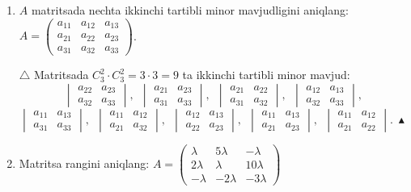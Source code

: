 \begin{enumerate}
\item $A$ matritsada nechta ikkinchi tartibli minor mavjudligini aniqlang:
$A=\begin{pmatrix}
	a_{11}&a_{12}&a_{13}\\
	a_{21}&a_{22}&a_{23}\\
	a_{31}&a_{32}&a_{33}
\end{pmatrix}$.

$\triangle$ Matritsada $C_3^2\cdot C_3^2=3\cdot3=9$ ta ikkinchi tartibli minor mavjud:
$$\begin{vmatrix}
	a_{22}&a_{23}\\
	a_{32}&a_{33}
\end{vmatrix},\ \ \begin{vmatrix}
a_{21}&a_{23}\\
a_{31}&a_{33}
\end{vmatrix},\ \ \begin{vmatrix}
a_{21}&a_{22}\\
a_{31}&a_{32}
\end{vmatrix},\ \ \begin{vmatrix}
a_{12}&a_{13}\\
a_{32}&a_{33}
\end{vmatrix},$$
$$\begin{vmatrix}
	a_{11}&a_{13}\\
	a_{31}&a_{33}
\end{vmatrix},\ \ \begin{vmatrix}
a_{11}&a_{12}\\
a_{21}&a_{32}
\end{vmatrix},\ \ \begin{vmatrix}
a_{12}&a_{13}\\
a_{22}&a_{23}
\end{vmatrix},\ \ \begin{vmatrix}
a_{11}&a_{13}\\
a_{21}&a_{23}
\end{vmatrix},\ \ \begin{vmatrix}
a_{11}&a_{12}\\
a_{21}&a_{22}
\end{vmatrix}.\ \blacktriangle$$

\item Matritsa rangini aniqlang: $A=\begin{pmatrix}
	\lambda&5\lambda&-\lambda\\
	2\lambda&\lambda&10\lambda\\
	-\lambda&-2\lambda&-3\lambda
\end{pmatrix}$


\end{enumerate}
